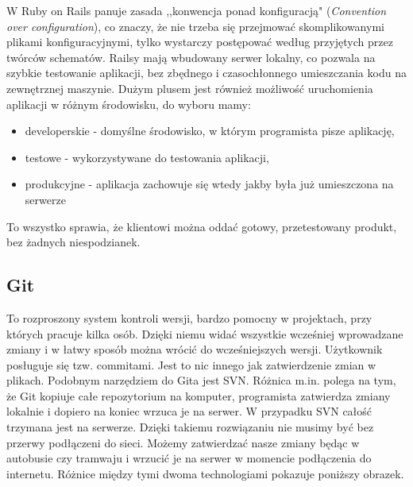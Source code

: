   W Ruby on Rails panuje zasada ,,konwencja ponad konfiguracją" (\emph{Convention over configuration}), co znaczy, że nie trzeba się przejmować skomplikowanymi plikami konfiguracyjnymi, tylko wystarczy postępować według przyjętych przez twórców schematów. Railsy mają wbudowany serwer lokalny, co pozwala na szybkie testowanie aplikacji, bez zbędnego i czasochłonnego umieszczania kodu na zewnętrznej maszynie. Dużym plusem jest również możliwość uruchomienia aplikacji w różnym środowisku, do wyboru mamy:
  \begin{itemize}
    \item developerskie - domyślne środowisko, w którym programista pisze aplikację,
    \item testowe - wykorzystywane do testowania aplikacji,
    \item produkcyjne - aplikacja zachowuje się wtedy jakby była już umieszczona na serwerze
  \end{itemize}
  To wszystko sprawia, że klientowi można oddać gotowy, przetestowany produkt, bez żadnych niespodzianek.

  \subsection{Git}
   \label{sec:GIT}
  To rozproszony system kontroli wersji, bardzo pomocny w projektach, przy których pracuje kilka osób. Dzięki niemu widać wszystkie  wcześniej wprowadzane zmiany i w łatwy sposób można wrócić do wcześniejszych wersji. Użytkownik posługuje się tzw. commitami. Jest to nic innego jak zatwierdzenie zmian w plikach. Podobnym narzędziem do Gita jest SVN. Różnica m.in. polega na tym, że Git kopiuje całe repozytorium na komputer, programista zatwierdza zmiany lokalnie i dopiero na koniec wrzuca je na serwer. W przypadku SVN całość trzymana jest na serwerze.
  Dzięki takiemu rozwiązaniu nie musimy być bez przerwy podłączeni do sieci. Możemy zatwierdzać nasze zmiany będąc w autobusie czy tramwaju i wrzucić je na serwer w momencie podłączenia do internetu.
  Różnice między tymi dwoma technologiami pokazuje poniższy obrazek.

